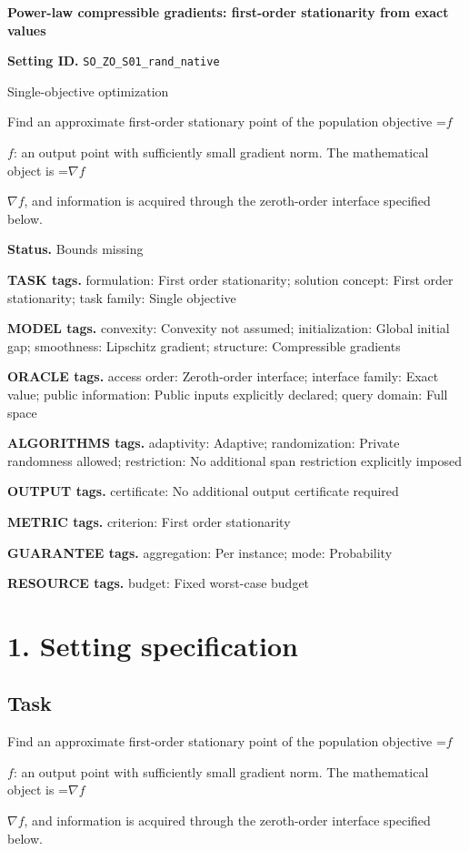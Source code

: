 \documentclass[10pt,a4paper]{article}
\newcommand{\AtlasMath}[1]{\par\begingroup\centering\setbox0=\hbox{$\displaystyle #1$}\ifdim\wd0>1.4\linewidth\typeout{ATLAS WIDE FORMULA: \the\wd0}\fi\ifdim\wd0>\linewidth\resizebox{\linewidth}{!}{\box0}\else\box0\fi\par\endgroup}
\newcommand{\AtlasInlineMath}[1]{\begingroup\setbox0=\hbox{$#1$}\ifdim\wd0>.4\linewidth\endgroup\AtlasMath{#1}\else\endgroup$#1$\fi}
\begin{document}
\raggedright

{\LARGE\bfseries\sffamily\color{AtlasNavy} Power-law compressible gradients: first-order stationarity from exact values\par}\vspace{5pt}
\textbf{Setting ID.} \texttt{SO\_\allowbreak{}ZO\_\allowbreak{}S01\_\allowbreak{}rand\_\allowbreak{}native}

Single-objective optimization

Find an approximate first-order stationary point of the population objective \AtlasInlineMath{f}: an output point with sufficiently small gradient norm. The mathematical object is \AtlasInlineMath{\nabla f}, and information is acquired through the zeroth-order interface specified below.

\textbf{Status.} Bounds missing

\textbf{TASK tags.} formulation: First order stationarity; solution concept: First order stationarity; task family: Single objective

\textbf{MODEL tags.} convexity: Convexity not assumed; initialization: Global initial gap; smoothness: Lipschitz gradient; structure: Compressible gradients

\textbf{ORACLE tags.} access order: Zeroth-order interface; interface family: Exact value; public information: Public inputs explicitly declared; query domain: Full space

\textbf{ALGORITHMS tags.} adaptivity: Adaptive; randomization: Private randomness allowed; restriction: No additional span restriction explicitly imposed

\textbf{OUTPUT tags.} certificate: No additional output certificate required

\textbf{METRIC tags.} criterion: First order stationarity

\textbf{GUARANTEE tags.} aggregation: Per instance; mode: Probability

\textbf{RESOURCE tags.} budget: Fixed worst-case budget

\section{1. Setting specification}
\subsection{Task}
Find an approximate first-order stationary point of the population objective \AtlasInlineMath{f}: an output point with sufficiently small gradient norm. The mathematical object is \AtlasInlineMath{\nabla f}, and information is acquired through the zeroth-order interface specified below.
\end{document}
